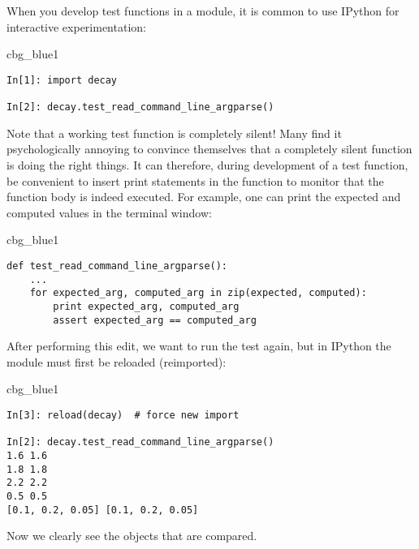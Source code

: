 \documentclass[graybox,sectrefs,envcountresetchap,open=right,final]{svmonodo}
\newenvironment{_cod_tight}[1]{
   \def\FrameCommand{\colorbox{#1}}
   \FrameRule0.6pt\MakeFramed {\FrameRestore}\vskip3mm}
   {\vskip0mm\endMakeFramed}
\newenvironment{cod}[1]{
\bgroup\rmfamily
\fboxsep=0mm\relax
\begin{_cod_tight}{#1}
\list{}{\parsep=-2mm\parskip=0mm\topsep=0pt\leftmargin=2mm
\rightmargin=2\leftmargin\leftmargin=4pt\relax}
\item\relax}
{\endlist\end{_cod_tight}\egroup}
\newenvironment{warning_mdfboxadmon}[1][]{
\begin{warning_mdfboxmdframed}[frametitle=#1]
}
{
\end{warning_mdfboxmdframed}
}
\begin{document}
\begin{warning_mdfboxadmon}
When you develop test functions in a module, it is common to use IPython
for interactive experimentation:

\begin{cod}{cbg_blue1}\begin{Verbatim}[numbers=none,fontsize=\fontsize{9pt}{9pt},baselinestretch=0.95,xleftmargin=2mm]
In[1]: import decay

In[2]: decay.test_read_command_line_argparse()
\end{Verbatim}
\end{cod}
\noindent

Note that a working test function is completely silent! Many
find it psychologically annoying to convince themselves that a
completely silent function is doing the right things. It can therefore,
during development of a test function, be convenient to insert
print statements in the function to monitor that the function body
is indeed executed. For example, one can print the expected and
computed values in the terminal window:

\begin{cod}{cbg_blue1}\begin{Verbatim}[numbers=none,fontsize=\fontsize{9pt}{9pt},baselinestretch=0.95,xleftmargin=2mm]
def test_read_command_line_argparse():
    ...
    for expected_arg, computed_arg in zip(expected, computed):
        print expected_arg, computed_arg
        assert expected_arg == computed_arg
\end{Verbatim}
\end{cod}
\noindent
After performing this edit, we want to run the test again, but
in IPython the module must first be reloaded (reimported):

\begin{cod}{cbg_blue1}\begin{Verbatim}[numbers=none,fontsize=\fontsize{9pt}{9pt},baselinestretch=0.95,xleftmargin=2mm]
In[3]: reload(decay)  # force new import

In[2]: decay.test_read_command_line_argparse()
1.6 1.6
1.8 1.8
2.2 2.2
0.5 0.5
[0.1, 0.2, 0.05] [0.1, 0.2, 0.05]
\end{Verbatim}
\end{cod}
\noindent
Now we clearly see the objects that are compared.
\end{warning_mdfboxadmon}
\end{document}
